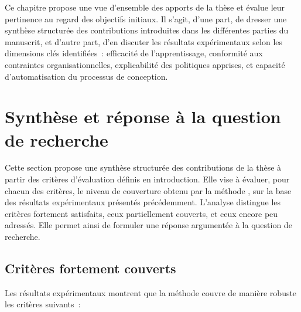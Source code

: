 Ce chapitre propose une vue d’ensemble des apports de la thèse et évalue leur pertinence au regard des objectifs initiaux. Il s’agit, d’une part, de dresser une synthèse structurée des contributions introduites dans les différentes parties du manuscrit, et d’autre part, d’en discuter les résultats expérimentaux selon les dimensions clés identifiées~: efficacité de l’apprentissage, conformité aux contraintes organisationnelles, explicabilité des politiques apprises, et capacité d’automatisation du processus de conception.

\section{Synthèse et réponse à la question de recherche}
\label{sec:synthese_recherche}

\noindent
Cette section propose une synthèse structurée des contributions de la thèse à partir des critères d’évaluation définis en introduction. Elle vise à évaluer, pour chacun des critères, le niveau de couverture obtenu par la méthode , sur la base des résultats expérimentaux présentés précédemment. L’analyse distingue les critères fortement satisfaits, ceux partiellement couverts, et ceux encore peu adressés. Elle permet ainsi de formuler une réponse argumentée à la question de recherche.

\subsection*{Critères fortement couverts}

Les résultats expérimentaux montrent que la méthode couvre de manière robuste les critères suivants~:

